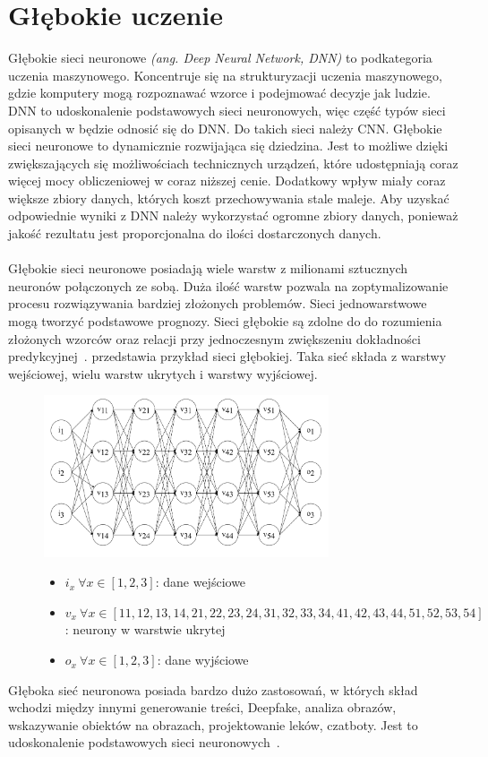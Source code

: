 \section{Głębokie uczenie}
\label{sec:deeplearn}
Głębokie sieci neuronowe \textit{(ang. Deep Neural Network, DNN)} to podkategoria uczenia maszynowego. Koncentruje się na strukturyzacji uczenia maszynowego, gdzie komputery mogą rozpoznawać wzorce i podejmować decyzje jak ludzie. DNN to udoskonalenie podstawowych sieci neuronowych, więc część typów sieci opisanych w  będzie odnosić się do DNN. Do takich sieci należy CNN. Głębokie sieci neuronowe to dynamicznie rozwijająca się dziedzina. Jest to możliwe dzięki zwiększających się możliwościach technicznych urządzeń, które udostępniają coraz więcej mocy obliczeniowej w coraz niższej cenie. Dodatkowy wpływ miały coraz większe zbiory danych, których koszt przechowywania stale maleje. Aby uzyskać odpowiednie wyniki z DNN należy wykorzystać ogromne zbiory danych, ponieważ jakość rezultatu jest proporcjonalna do ilości dostarczonych danych.
\\ \\
Głębokie sieci neuronowe posiadają wiele warstw z milionami sztucznych neuronów połączonych ze sobą. Duża ilość warstw pozwala na zoptymalizowanie procesu rozwiązywania bardziej złożonych problemów. Sieci jednowarstwowe mogą tworzyć podstawowe prognozy. Sieci głębokie są zdolne do do rozumienia złożonych wzorców oraz relacji przy jednoczesnym zwiększeniu dokładności predykcyjnej~\cite{Crabtree}.  przedstawia przykład sieci głębokiej. Taka sieć składa z warstwy wejściowej, wielu warstw ukrytych i warstwy wyjściowej.

\begin{figure}[H]
    \centering
    \includegraphics[width=0.75\textwidth]{images/deep-neural-network}
    \begin{itemize}
        \item[] $i_x \  \forall x \in [1, 2, 3]$: dane wejściowe
        \item[] $v_x \ \forall x \in [11, 12, 13, 14, 21, 22, 23, 24, 31, 32, 33, 34, 41, 42, 43, 44, 51, 52, 53, 54]$: neurony w warstwie ukrytej
        \item[] $o_x \ \forall x \in [1, 2, 3]$: dane wyjściowe
    \end{itemize}
    \label{fig:deep-learn}
\end{figure}

Głęboka sieć neuronowa posiada bardzo dużo zastosowań, w których skład wchodzi między innymi generowanie treści, Deepfake, analiza obrazów, wskazywanie obiektów na obrazach, projektowanie leków, czatboty. Jest to udoskonalenie podstawowych sieci neuronowych~\cite{MicrosoftDeep2023}.